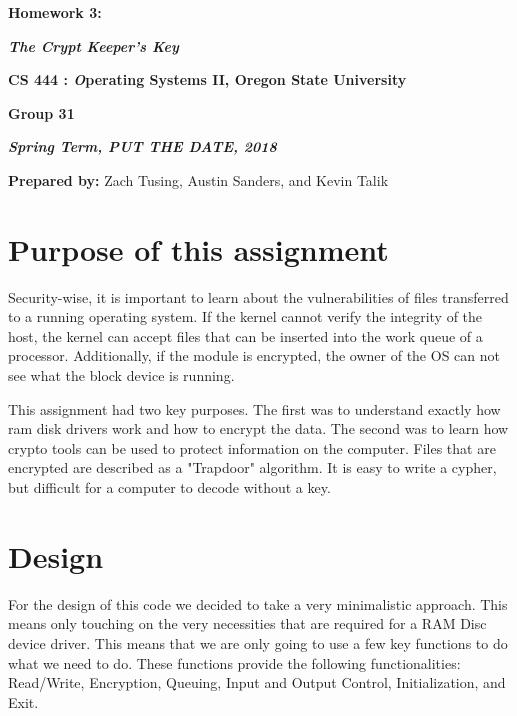 \documentclass[onecolumn, draftclsnofoot,10pt, compsoc]{IEEEtran}
\def \GroupMemberOne{			Zach Tusing}
\def \GroupMemberTwo{			Austin Sanders}
\def \GroupMemberThree{			Kevin Talik}
\begin{document}
 	\begin{center}
	\huge\bf{ Homework 3:} 
   
    \large\textbf{\textit{ The Crypt Keeper's Key }}\par
     
    
    
	\small{\bf CS 444 : \textit Operating Systems II, Oregon State University}\par
    \small{\bf{Group 31}}
    
    
    {\bf\textit{ Spring Term, PUT THE DATE, 2018} }
    
    
    {\small {\bf Prepared by:} \GroupMemberOne, \GroupMemberTwo, and \GroupMemberThree }
        \end{center}
 		\vfill

       \pagebreak
       \section{ Purpose of this assignment }

        Security-wise, it is important to learn about the vulnerabilities of files transferred to a running operating system. If the kernel cannot verify the integrity of the host, the kernel can accept files that can be inserted into the work queue of a processor. Additionally, if the module is encrypted, the owner of the OS can not see what the block device is running. 

		This assignment had two key purposes. The first was to understand exactly how ram disk drivers work and how to encrypt the data. The second was to learn how crypto tools can be used to protect information on the computer. Files that are encrypted are described as a "Trapdoor" algorithm. It is easy to write a cypher, but difficult for a computer to decode without a key. 

	\section{ Design }
    
    	For the design of this code we decided to take a very minimalistic approach. This means only touching on the very necessities that are required for a RAM Disc device driver. This means that we are only going to use a few key functions to do what we need to do. These functions provide the following functionalities: Read/Write, Encryption, Queuing, Input and Output Control, Initialization, and Exit.
\end{document}
